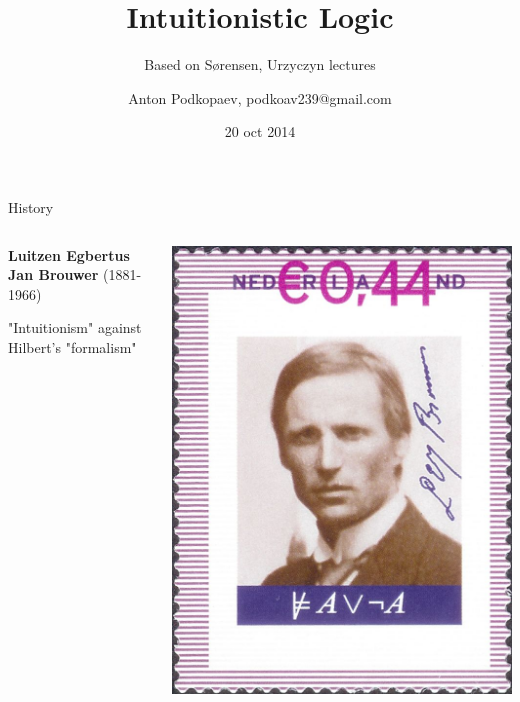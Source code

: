 \documentclass[sans]{beamer}
\begin{document}
\title
[Intuitionistic Logic]
{Intuitionistic Logic}

\subtitle{Based on S\o rensen, Urzyczyn lectures}

\author
[Podkopaev]{Anton Podkopaev, podkoav239@gmail.com}
\date [20-10-14]{20 oct 2014}

\begin{frame}[plain]
	\titlepage
\end{frame}

\begin{frame}{History}
  \begin{columns}

  \begin{column}{0.5\linewidth}
    \textbf{Luitzen Egbertus Jan Brouwer} (1881-1966)

    \vfill

    "Intuitionism" against Hilbert's "formalism"
  \end{column}

  \begin{column}{0.5\linewidth}
    \includegraphics[width = \linewidth]{images/brouwer.jpg}
  \end{column}

  \end{columns}
\end{frame}
\end{document}
